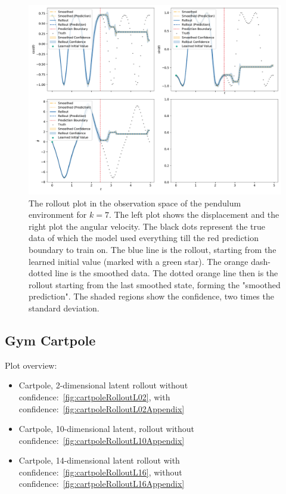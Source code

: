 		\begin{figure}
			\centering
			\includegraphics[width=\linewidth]{figures/results/pendulum-gym/run-latent-dim-07/rollout-observations-N0.pdf}
			\caption{The rollout plot in the observation space of the pendulum environment for \(k = 7\). The left plot shows the displacement and the right plot the angular velocity. The black dots represent the true data of which the model used everything till the red prediction boundary to train on. The blue line is the rollout, starting from the learned initial value (marked with a green star). The orange dash-dotted line is the smoothed data. The dotted orange line then is the rollout starting from the last smoothed state, forming the "smoothed prediction". The shaded regions show the confidence, \ie two times the standard deviation.}
			\label{fig:gymPendulumRolloutL7}
		\end{figure}

	\subsection{Gym Cartpole}
		Plot overview:
		\begin{itemize}
			\item Cartpole, 2-dimensional latent rollout without confidence:~\autoref{fig:cartpoleRolloutL02}, with confidence:~\autoref{fig:cartpoleRolloutL02Appendix}
			\item Cartpole, 10-dimensional latent, rollout without confidence:~\autoref{fig:cartpoleRolloutL10Appendix}
			\item Cartpole, 14-dimensional latent rollout with confidence:~\autoref{fig:cartpoleRolloutL16}, without confidence:~\autoref{fig:cartpoleRolloutL16Appendix}
		\end{itemize}

